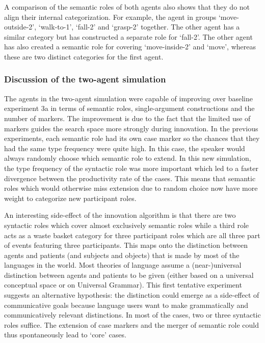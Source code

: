 A comparison of the semantic roles of both agents also shows that they do not align their internal categorization. For example, the agent in  groups `move-outside-2', `walk-to-1', `fall-2' and `grasp-2' together. The other agent has a similar category but has constructed a separate role for `fall-2'. The other agent has also created a semantic role for covering `move-inside-2' and `move', whereas these are two distinct categories for the first agent.


\subsubsection{Discussion of the two-agent simulation}
 The agents in the two-agent simulation were capable of improving over baseline experiment 3a in terms of semantic roles, single-argument constructions and the number of markers. The improvement is due to the fact that the limited use of markers guides the search space more strongly during innovation. In the previous experiments, each semantic role had its own case marker so the chances that they had the same type frequency were quite high. In this case, the speaker would always randomly choose which semantic role to extend. In this new simulation, the type frequency of the syntactic role was more important which led to a faster divergence between the productivity rate of the cases. This means that semantic roles which would otherwise miss extension due to random choice now have more weight to categorize new participant roles.

An interesting side-effect of the innovation algorithm is that there are two syntactic roles which cover almost exclusively semantic roles while a third role acts as a waste basket category for three participant roles which are all three part of events featuring three participants. This maps onto the distinction between agents and patients (and subjects and objects) that is made by most of the languages in the world. Most theories of language assume a (near-)universal distinction between agents and patients to be given (either based on a universal conceptual space or on Universal Grammar). This first tentative experiment suggests an alternative hypothesis: the distinction could emerge as a side-effect of communicative goals because language users want to make grammatically and communicatively relevant distinctions. In most of the cases, two or three syntactic roles suffice. The extension of case markers and the merger of semantic role could thus spontaneously lead to `core' cases.

